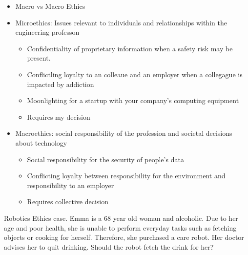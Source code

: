 \documentclass[a4paper]{article}
\numberwithin{equation}{section}
\begin{document}
\begin{itemize}
    \item Macro vs Macro Ethics
    \item Microethics: Issues relevant to individuals and relationships within the engineering professon
    \begin{itemize}
        \item Confidentiality of proprietary information when a safety risk may be present.
        \item Conflictling loyalty to an colleaue and an employer when a collegague is impacted by addiction
        \item Moonlighting for a startup with your company's computing equipment
        \item Requires my decision
    \end{itemize}
    \item Macroethics: social responsibility of the profession and societal decisions about technology
    \begin{itemize}
        \item Social responsibility for the security of people's data
        \item Conflicting loyalty between responsibility for the environment and responsibility to an employer
        \item Requires collective decision
    \end{itemize}
\end{itemize}

\begin{example}
    Robotics Ethics case. Emma is a 68 year old woman and alcoholic. Due to her age and poor health, she is unable to perform everyday tasks such as fetching objects or cooking for herself. Therefore, she purchased a care robot. Her doctor advises her to quit drinking. Should the robot fetch the drink for her?
\end{example}
\end{document}
